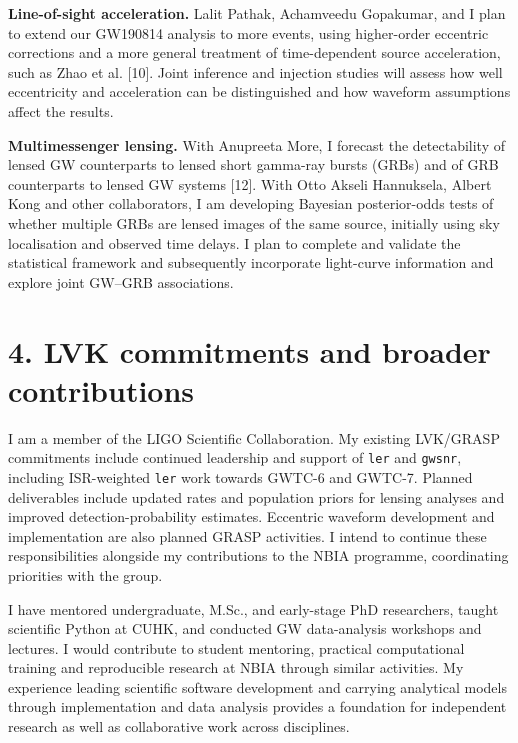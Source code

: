 \documentclass[11pt]{article}
\begin{document}
\textbf{Line-of-sight acceleration.} Lalit Pathak, Achamveedu Gopakumar, and I plan to extend our GW190814 analysis to more events, using higher-order eccentric corrections and a more general treatment of time-dependent source acceleration, such as Zhao et al. [10]. Joint inference and injection studies will assess how well eccentricity and acceleration can be distinguished and how waveform assumptions affect the results.

\textbf{Multimessenger lensing.} With Anupreeta More, I forecast the detectability of lensed GW counterparts to lensed short gamma-ray bursts (GRBs) and of GRB counterparts to lensed GW systems [12]. With Otto Akseli Hannuksela, Albert Kong and other collaborators, I am developing Bayesian posterior-odds tests of whether multiple GRBs are lensed images of the same source, initially using sky localisation and observed time delays. I plan to complete and validate the statistical framework and subsequently incorporate light-curve information and explore joint GW--GRB associations.

\section*{4. LVK commitments and broader contributions}
I am a member of the LIGO Scientific Collaboration. My existing LVK/GRASP commitments include continued leadership and support of \texttt{ler} and \texttt{gwsnr}, including ISR-weighted \texttt{ler} work towards GWTC-6 and GWTC-7. Planned deliverables include updated rates and population priors for lensing analyses and improved detection-probability estimates. Eccentric waveform development and implementation are also planned GRASP activities. I intend to continue these responsibilities alongside my contributions to the NBIA programme, coordinating priorities with the group.

I have mentored undergraduate, M.Sc., and early-stage PhD researchers, taught scientific Python at CUHK, and conducted GW data-analysis workshops and lectures. I would contribute to student mentoring, practical computational training and reproducible research at NBIA through similar activities. My experience leading scientific software development and carrying analytical models through implementation and data analysis provides a foundation for independent research as well as collaborative work across disciplines.
\end{document}
